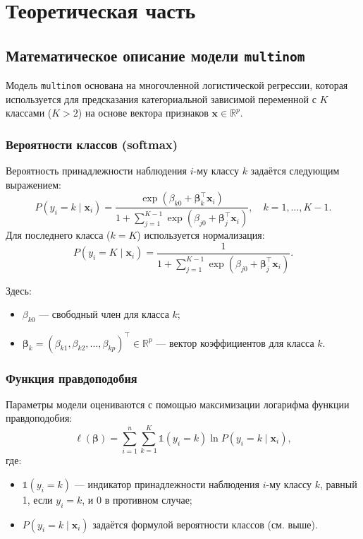 


\setcounter{section}{0} %
\renewcommand\thesection{\arabic{section}} %
\label{cha:analysis}
\chapter{Теоретическая часть}

\section{Математическое описание модели \texttt{multinom}}

Модель \texttt{multinom} основана на многочленной логистической регрессии, которая используется для предсказания категориальной зависимой переменной с \( K \) классами (\( K > 2 \)) на основе вектора признаков \( \mathbf{x} \in \mathbb{R}^p \).

\subsection{Вероятности классов (\textbf{softmax})}
Вероятность принадлежности наблюдения \( i \)-му классу \( k \) задаётся следующим выражением:
\[
P(y_i = k \mid \mathbf{x}_i) = 
\frac{\exp(\beta_{k0} + \mathbf{\beta}_k^\top \mathbf{x}_i)}{
	1 + \sum_{j=1}^{K-1} \exp(\beta_{j0} + \mathbf{\beta}_j^\top \mathbf{x}_i)}, \quad k = 1, \dots, K-1.
\]
Для последнего класса (\( k = K \)) используется нормализация:
\[
P(y_i = K \mid \mathbf{x}_i) = 
\frac{1}{
	1 + \sum_{j=1}^{K-1} \exp(\beta_{j0} + \mathbf{\beta}_j^\top \mathbf{x}_i)}.
\]

Здесь:
\begin{itemize}
	\item \( \beta_{k0} \) — свободный член для класса \( k \);
	\item \( \mathbf{\beta}_k = (\beta_{k1}, \beta_{k2}, \dots, \beta_{kp})^\top \in \mathbb{R}^p \) — вектор коэффициентов для класса \( k \).
\end{itemize}

\subsection{Функция правдоподобия}
Параметры модели оцениваются с помощью максимизации логарифма функции правдоподобия:
\[
\ell(\boldsymbol{\beta}) = \sum_{i=1}^n \sum_{k=1}^K \mathbb{1}(y_i = k) \ln P(y_i = k \mid \mathbf{x}_i),
\]
где:
\begin{itemize}
	\item \( \mathbb{1}(y_i = k) \) — индикатор принадлежности наблюдения \( i \)-му классу \( k \), равный 1, если \( y_i = k \), и 0 в противном случае;
	\item \( P(y_i = k \mid \mathbf{x}_i) \) задаётся формулой вероятности классов (см. выше).
\end{itemize}


